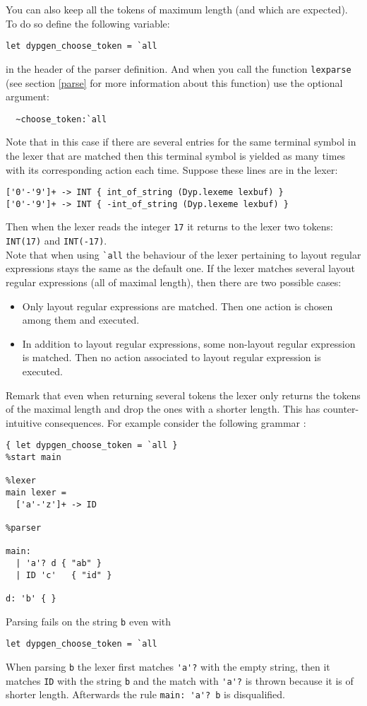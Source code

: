 \documentclass[12pt]{article}
\begin{document}
{You can also keep all the tokens of maximum length (and which are expected). To do so define the following variable:
\begin{verbatim}
let dypgen_choose_token = `all
\end{verbatim}
in the header of the parser definition. And when you call the function \verb|lexparse| (see section \ref{parse} for more information about this function) use the optional argument:
\begin{verbatim}
  ~choose_token:`all
\end{verbatim}
Note that in this case if there are several entries for the same terminal symbol in the lexer that are matched then this terminal symbol is yielded as many times with its corresponding action each time. Suppose these lines are in the lexer:
\begin{verbatim}
['0'-'9']+ -> INT { int_of_string (Dyp.lexeme lexbuf) }
['0'-'9']+ -> INT { -int_of_string (Dyp.lexeme lexbuf) }
\end{verbatim}
Then when the lexer reads the integer \verb|17| it returns to the lexer two tokens: \verb|INT(17)| and \verb|INT(-17)|.\\

Note that when using \verb|`all| the behaviour of the lexer pertaining to layout regular expressions stays the same as the default one. If the lexer matches several layout regular expressions (all of maximal length), then there are two possible cases:
\begin{itemize}
\item Only layout regular expressions are matched. Then one action is chosen among them and executed.
\item In addition to layout regular expressions, some non-layout regular expression is matched. Then no action associated to layout regular expression is executed.
\end{itemize}

Remark that even when returning several tokens the lexer only returns the tokens of the maximal length and drop the ones with a shorter length. This has counter-intuitive consequences. For example consider the following grammar :
\begin{verbatim}
{ let dypgen_choose_token = `all }
%start main

%lexer
main lexer =
  ['a'-'z']+ -> ID

%parser

main:
  | 'a'? d { "ab" }
  | ID 'c'   { "id" }

d: 'b' { }
\end{verbatim}
Parsing fails on the string \verb|b| even with
\begin{verbatim}
let dypgen_choose_token = `all
\end{verbatim}
When parsing \verb|b| the lexer first matches \verb|'a'?| with the empty string, then it matches \verb|ID| with the string \verb|b| and the match with \verb|'a'?| is thrown because it is of shorter length. Afterwards the rule \verb|main: 'a'? b| is disqualified.\\

}
\end{document}
